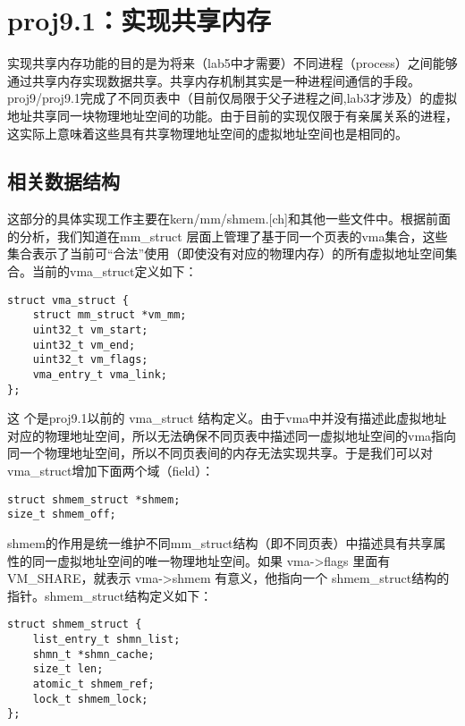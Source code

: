 \section{proj9.1：实现共享内存}\label{proj9.1ux5b9eux73b0ux5171ux4eabux5185ux5b58}

实现共享内存功能的目的是为将来（lab5中才需要）不同进程（process）之间能够通过共享内存实现数据共享。共享内存机制其实是一种进程间通信的手段。proj9/proj9.1完成了不同页表中（目前仅局限于父子进程之间,lab3才涉及）的虚拟地址共享同一块物理地址空间的功能。由于目前的实现仅限于有亲属关系的进程，这实际上意味着这些具有共享物理地址空间的虚拟地址空间也是相同的。

\subsection{相关数据结构}\label{ux76f8ux5173ux6570ux636eux7ed3ux6784}

这部分的具体实现工作主要在kern/mm/shmem.{[}ch{]}和其他一些文件中。根据前面的分析，我们知道在mm\_struct
层面上管理了基于同一个页表的vma集合，这些集合表示了当前可``合法''使用（即使没有对应的物理内存）的所有虚拟地址空间集合。当前的vma\_struct定义如下：

\begin{lstlisting}
struct vma_struct {
    struct mm_struct *vm_mm;
    uint32_t vm_start;
    uint32_t vm_end;
    uint32_t vm_flags;
    vma_entry_t vma_link;
};
\end{lstlisting}

这 个是proj9.1以前的 vma\_struct
结构定义。由于vma中并没有描述此虚拟地址对应的物理地址空间，所以无法确保不同页表中描述同一虚拟地址空间的vma指向同一个物理地址空间，所以不同页表间的内存无法实现共享。于是我们可以对vma\_struct增加下面两个域（field）：

\begin{lstlisting}
struct shmem_struct *shmem;
size_t shmem_off;
\end{lstlisting}

shmem的作用是统一维护不同mm\_struct结构（即不同页表）中描述具有共享属性的同一虚拟地址空间的唯一物理地址空间。如果
vma-\textgreater{}flags 里面有 VM\_SHARE，就表示 vma-\textgreater{}shmem
有意义，他指向一个 shmem\_struct结构的指针。shmem\_struct结构定义如下：

\begin{lstlisting}
struct shmem_struct {
    list_entry_t shmn_list;
    shmn_t *shmn_cache;
    size_t len;
    atomic_t shmem_ref;
    lock_t shmem_lock;
};
\end{lstlisting}

